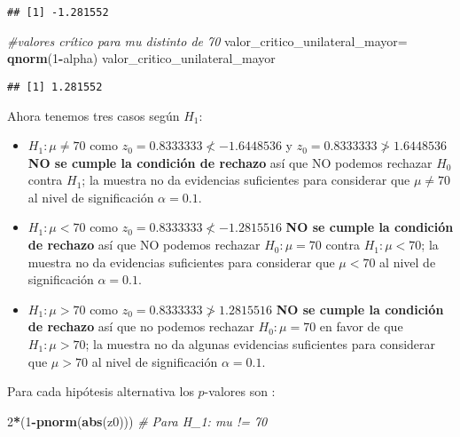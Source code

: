 \documentclass[
]{article}
\newenvironment{Shaded}{\begin{snugshade}}{\end{snugshade}}
\newcommand{\CommentTok}[1]{\textcolor[rgb]{0.56,0.35,0.01}{\textit{#1}}}
\newcommand{\DecValTok}[1]{\textcolor[rgb]{0.00,0.00,0.81}{#1}}
\newcommand{\KeywordTok}[1]{\textcolor[rgb]{0.13,0.29,0.53}{\textbf{#1}}}
\newcommand{\NormalTok}[1]{#1}
\newcommand{\OperatorTok}[1]{\textcolor[rgb]{0.81,0.36,0.00}{\textbf{#1}}}
\newcommand{\StringTok}[1]{\textcolor[rgb]{0.31,0.60,0.02}{#1}}
\providecommand{\tightlist}{%
  \setlength{\itemsep}{0pt}\setlength{\parskip}{0pt}}
\begin{document}
\begin{verbatim}
## [1] -1.281552
\end{verbatim}

\begin{Shaded}
\begin{Highlighting}[]
\CommentTok{#valores crítico para mu  distinto de 70}
\NormalTok{valor_critico_unilateral_mayor=}\StringTok{ }\KeywordTok{qnorm}\NormalTok{(}\DecValTok{1}\OperatorTok{-}\NormalTok{alpha)}
\NormalTok{valor_critico_unilateral_mayor}
\end{Highlighting}
\end{Shaded}

\begin{verbatim}
## [1] 1.281552
\end{verbatim}

Ahora tenemos tres casos según \(H_1\):

\begin{itemize}
\tightlist
\item
  \(H_1: \mu \not= 70\) como \(z_0= 0.8333333 \not< -1.6448536\) y
  \(z_0= 0.8333333 \not > 1.6448536\) \textbf{NO se cumple la condición
  de rechazo} así que NO podemos rechazar \(H_0\) contra \(H_1\); la
  muestra no da evidencias suficientes para considerar que
  \(\mu\not= 70\) al nivel de significación \(\alpha=0.1\).
\item
  \(H_1: \mu < 70\) como \(z_0= 0.8333333 \not<-1.2815516\) \textbf{NO
  se cumple la condición de rechazo} así que NO podemos rechazar
  \(H_0:\mu=70\) contra \(H_1:\mu<70\); la muestra no da evidencias
  suficientes para considerar que \(\mu < 70\) al nivel de significación
  \(\alpha=0.1\).
\item
  \(H_1: \mu > 70\) como \(z_0= 0.8333333 \not >1.2815516\) \textbf{NO
  se cumple la condición de rechazo} así que no podemos rechazar
  \(H_0:\mu=70\) en favor de que \(H_1:\mu>70\); la muestra no da
  algunas evidencias suficientes para considerar que \(\mu > 70\) al
  nivel de significación \(\alpha=0.1\).
\end{itemize}

Para cada hipótesis alternativa los \(p\)-valores son :

\begin{Shaded}
\begin{Highlighting}[]
\DecValTok{2}\OperatorTok{*}\NormalTok{(}\DecValTok{1}\OperatorTok{-}\KeywordTok{pnorm}\NormalTok{(}\KeywordTok{abs}\NormalTok{(z0))) }\CommentTok{# Para H_1: mu != 70}
\end{Highlighting}
\end{Shaded}
\end{document}
